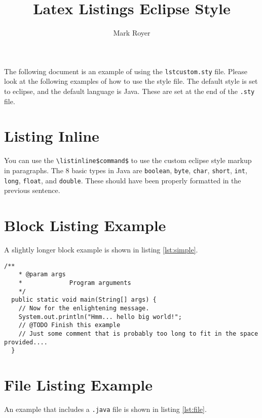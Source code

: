 \documentclass{article}
\title{Latex Listings Eclipse Style}
\date{}
\author{Mark Royer}
\begin{document}
\abstract

The following document is an example of using the
\texttt{lstcustom.sty} file.  Please look at the following examples
of how to use the style file. The default style is set to eclipse, and
the default language is Java.  These are set at the end of the
\texttt{.sty} file.

\section*{Listing Inline}

\lstset{breaklines=false}

You can use the \texttt{\textbackslash listinline\$command\$} to use the custom
eclipse style markup in paragraphs.  The 8 basic types in Java are
\lstinline$boolean$, \lstinline$byte$, \lstinline$char$,
\lstinline$short$, \lstinline$int$, \lstinline$long$,
\lstinline$float$, and \lstinline$double$. These should have been
properly formatted in the previous sentence.

\lstset{breaklines=true}

\section*{Block Listing Example}

A slightly longer block example is shown in listing \ref{lst:simple}.

\begin{lstlisting}[caption={A simple listing.}, label={lst:simple}]
  /**
    * @param args
    *             Program arguments
    */
  public static void main(String[] args) {
    // Now for the enlightening message.
    System.out.println("Hmm... hello big world!";
    // @TODO Finish this example
    // Just some comment that is probably too long to fit in the space provided....
  }
\end{lstlisting}

\section*{File Listing Example}

An example that includes a \texttt{.java} file is shown in listing \ref{lst:file}.


\end{document}
